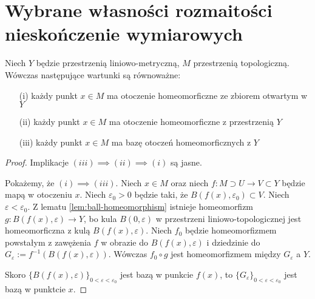 \section{Wybrane własności rozmaitości nieskończenie wymiarowych}

\begin{lem} \label{lem:basic-atlas}
  Niech $Y$ będzie przestrzenią liniowo-metryczną, $M$ przestrzenią topologiczną. Wówczas następujące wartunki są równoważne:
  \begin{enumerate}
   \item[(i)] każdy punkt $x \in M$ ma otoczenie homeomorficzne ze zbiorem otwartym w $Y$
   \item[(ii)] każdy punkt $x \in M$ ma otoczenie homeomorficzne z przestrzenią $Y$
   \item[(iii)] każdy punkt $x \in M$ ma bazę otoczeń homeomorficznych z $Y$
  \end{enumerate}

  \begin{proof}
    Implikacje $(iii) \implies (ii) \implies (i)$ są jasne.
    
    Pokażemy, że $(i) \implies (iii)$. Niech $x \in M$ oraz niech $f: M \supset U \to V \subset Y$ będzie mapą w otoczeniu $x$. Niech $\varepsilon_0 > 0$ będzie taki, że $B(f(x), \varepsilon_0) \subset V$. Niech $\varepsilon < \varepsilon_0$. Z lematu \ref{lem:ball-homeomorphism} istnieje homeomorfizm $g: B(f(x), \varepsilon) \to Y$, bo kula $B(0, \varepsilon)$ w przestrzeni liniowo-topologicznej jest homeomorficzna z kulą $B(f(x), \varepsilon)$. Niech $f_0$ będzie homeomorfizmem powstałym z zawężenia $f$ w obrazie do $B(f(x), \varepsilon)$ i dziedzinie do $G_\varepsilon := f^{-1}(B(f(x), \varepsilon))$. Wówczas $f_0 \circ g$ jest homeomorfizmem między $G_\varepsilon$ a $Y$.
    
    Skoro $\{B(f(x), \varepsilon)\}_{0 < \varepsilon < \varepsilon_0}$ jest bazą w punkcie $f(x)$, to $\{G_\varepsilon\}_{0 < \varepsilon < \varepsilon_0}$ jest bazą w punktcie $x$.
  \end{proof}
\end{lem}

